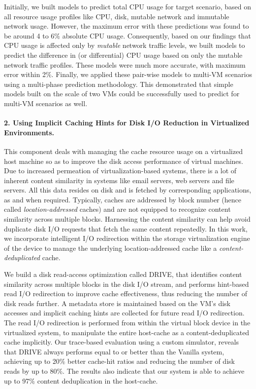 Initially, we built models to predict total CPU usage for target scenario,
based on all resource usage profiles like CPU, disk, mutable network
and immutable network usage. However, the maximum error with these 
predictions was found to be around 4 to 6\% absolute CPU usage. 
Consequently, based on our findings that CPU usage is affected only by
\textit{mutable} network traffic levels, we built models to 
predict the difference in (or differential) CPU usage based on only
the mutable network traffic profiles. These models were much more
accurate, with maximum error within 2\%. Finally, we applied these
pair-wise models to multi-VM scenarios using a multi-phase
prediction methodology. This demonstrated that simple models
built on the scale of two VMs could be successfully used to
predict for multi-VM scenarios as well.

\paragraph{2. Using Implicit Caching Hints for {D}isk I/O {R}eduction in Virtualized Environments.}
This component deals with managing the cache resource
usage on a virtualized host machine so as to improve the disk access performance 
of virtual machines.
Due to increased permeation of virtualization-based systems, there is a lot of 
inherent content similarity in systems like email servers, web servers 
and file servers. All this data resides on disk and is fetched by corresponding
applications, as and when required. 
Typically, caches are addressed by block number (hence called 
\textit{location-addressed} caches) and are not
equipped to recognize content similarity across multiple blocks.
Harnessing the content similarity can help 
avoid duplicate disk I/O requests that fetch the same content repeatedly.
In this work, we incorporate intelligent I/O redirection within the 
storage virtualization engine of the device to manage the underlying 
location-addressed cache like a \textit{content-deduplicated} cache.

We build a disk read-access optimization called DRIVE, that
identifies content similarity across multiple blocks in the disk I/O stream, 
and performs hint-based read I/O redirection to improve cache effectiveness,
thus reducing the number of disk reads further.
A metadata store is maintained based on the VM's disk
accesses and implicit caching hints are collected
for future read I/O redirection.
The read I/O redirection is performed from within the virtual
block device in the virtualized system, to manipulate the entire
host-cache as a content-deduplicated cache implicitly.
Our trace-based evaluation using a custom simulator, 
reveals that
DRIVE always performs equal to or better than the Vanilla system,
achieving up to 20\% better cache-hit ratios and reducing the
number of disk reads by up to 80\%. The results also indicate that
our system is able to achieve up to 97\% content 
deduplication in the host-cache.

